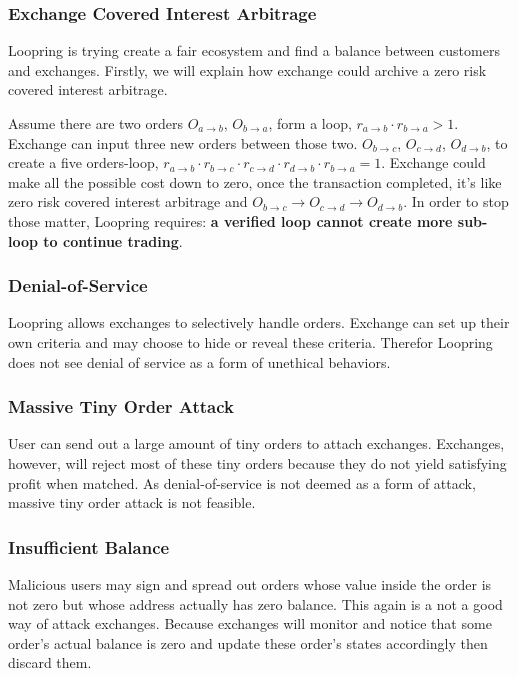 \documentclass[UTF8,nofonts]{article}
\begin{document}
\subsubsection{Exchange Covered Interest Arbitrage}

Loopring is trying create a fair ecosystem and find a balance between customers and exchanges. Firstly,  we will explain how exchange could archive a zero risk covered interest arbitrage.

Assume there are two orders $O_{a\rightarrow b}$, $O_{b\rightarrow a}$, form a loop, $r_{a\rightarrow b} \cdot r_{b\rightarrow a} > 1$. Exchange can input three new orders between those two. $O_{b\rightarrow c}$, $O_{c\rightarrow d}$, $O_{d\rightarrow b}$, to create a five orders-loop,  $r_{a\rightarrow b} \cdot r_{b\rightarrow c} \cdot r_{c\rightarrow d}\cdot r_{d\rightarrow b}\cdot r_{b\rightarrow a} = 1$. Exchange could make all the possible cost down to zero, once the transaction completed, it's like zero risk covered interest arbitrage
and $O_{b\rightarrow c}\rightarrow O_{c\rightarrow d}\rightarrow O_{d\rightarrow b}$. In order to stop those matter, Loopring requires: {\bfseries a verified loop cannot create more sub-loop to continue trading}.

\subsubsection{Denial-of-Service}

Loopring allows exchanges to selectively handle orders. Exchange can set up their own criteria and may choose to hide or reveal these criteria. Therefor Loopring does not see denial of service as a form of unethical behaviors.

\subsubsection{Massive Tiny Order Attack}
User can send out a large amount of tiny orders to attach exchanges. Exchanges, however, will reject most of these tiny orders because they do not yield satisfying profit when matched. As denial-of-service is not deemed as a form of attack, massive tiny order attack is not feasible.

\subsubsection{Insufficient Balance}

Malicious users may sign and spread out orders whose value inside the order is not zero but whose address actually has zero balance. This again is a not a good way of attack exchanges. Because exchanges will monitor and notice that some order's actual balance is zero and update these order's states accordingly then discard them.  
\end{document}
